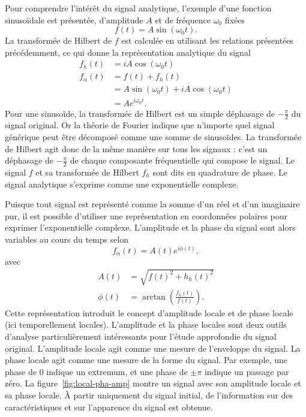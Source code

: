 Pour comprendre l'intérêt du signal analytique, l'exemple d'une fonction sinusoïdale est présentée, d'amplitude $A$ et de fréquence $\omega_0$ fixées
\begin{equation}
    f(t) = A\sin(\omega_0t).
\end{equation}
La transformée de Hilbert de $f$ est calculée en utilisant les relations présentées précédemment, ce qui donne la représentation analytique du signal
\begin{align*}
    f_h(t) &= iA\cos(\omega_0t) \\
    f_{\alpha}(t) &= f(t) + f_h(t) \\
    &= A\sin(\omega_0t)+iA\cos(\omega_0t) \\
    &= Ae^{i\omega_0t}.
\end{align*}
Pour une sinusoïde, la transformée de Hilbert est un simple déphasage de $-\frac{\pi}2$ du signal original. Or la théorie de Fourier indique que n'importe quel signal générique peut être décomposé comme une somme de sinusoïdes. La transformée de Hilbert agit donc de la même manière sur tous les signaux : c'est un déphasage de $-\frac{\pi}2$ de chaque composante fréquentielle qui compose le signal. Le signal $f$ et sa transformée de Hilbert $f_h$ sont dits en quadrature de phase. Le signal analytique s'exprime comme une exponentielle complexe.

\bigskip

Puisque tout signal est représenté comme la somme d'un réel et d'un imaginaire pur, il est possible d'utiliser une représentation en coordonnées polaires pour exprimer l'exponentielle complexe. L'amplitude et la phase du signal sont alors variables au cours du temps selon
\begin{equation}
    f_{\alpha} (t) = A(t)e^{i\phi(t)},
\end{equation}
avec
\begin{align}
    A(t) &= \sqrt{f(t)^2 + h_h(t)^2} \\
    \phi(t) &= \arctan\left(\frac{f_h(t)}{f(t)}\right).
\end{align}
Cette représentation introduit le concept d'amplitude locale et de phase locale (ici temporellement locales). L'amplitude et la phase locales sont deux outils d'analyse particulièrement intéressants pour l'étude approfondie du signal original. L'amplitude locale agit comme une mesure de l'enveloppe du signal. La phase locale agit comme une mesure de la forme du signal. Par exemple, une phase de $0$ indique un extremum, et une phase de $\pm\pi$ indique un passage par zéro. La figure~\ref{fig:local-pha-amp} montre un signal avec son amplitude locale et sa phase locale. À partir uniquement du signal initial, de l'information sur des caractéristiques et sur l'apparence du signal est obtenue.

